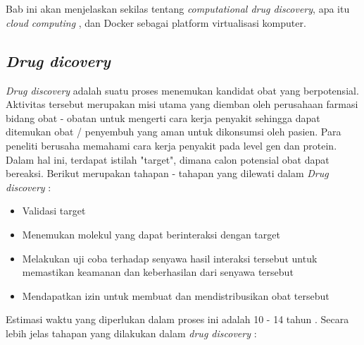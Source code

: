 \chapter{\babDua}
Bab ini akan menjelaskan sekilas tentang \textit{computational drug discovery}, apa itu \textit{cloud computing} , dan Docker sebagai platform virtualisasi komputer. 
\section{\textit{Drug dicovery}}
\hspace{0.5cm}\textit{Drug discovery} adalah suatu proses menemukan kandidat obat yang berpotensial. Aktivitas tersebut merupakan misi utama yang diemban oleh perusahaan farmasi bidang obat - obatan untuk mengerti cara kerja penyakit sehingga dapat ditemukan obat / penyembuh yang aman untuk dikonsumsi oleh pasien. Para peneliti berusaha memahami cara kerja penyakit pada level gen dan protein. Dalam hal ini, terdapat istilah "target", dimana calon potensial obat dapat bereaksi. Berikut merupakan tahapan - tahapan yang dilewati dalam \textit{Drug discovery} \cite{Drugdiscovery} :
\begin{itemize}
	\item Validasi target
	\item Menemukan molekul yang dapat berinteraksi dengan target
	\item Melakukan uji coba terhadap senyawa hasil interaksi tersebut untuk memastikan keamanan dan keberhasilan dari senyawa tersebut
	\item Mendapatkan izin untuk membuat dan mendistribusikan obat tersebut 
\end{itemize}
Estimasi waktu yang diperlukan dalam proses ini adalah 10 - 14 tahun \cite{Drugdiscovery2}. Secara lebih jelas tahapan yang dilakukan dalam \textit{drug discovery} :

